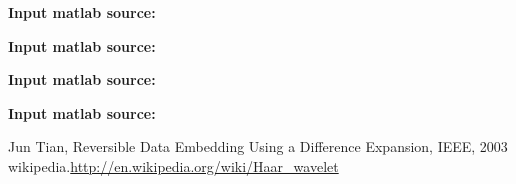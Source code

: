 \documentclass[a4paper,12pt]{article}%
\begin{document}
\textbf{\textcolor[rgb]{0.98,0.00,0.00}{Input matlab source:}}


\textbf{\textcolor[rgb]{0.98,0.00,0.00}{Input matlab source:}}


\textbf{\textcolor[rgb]{0.98,0.00,0.00}{Input matlab source:}}


\textbf{\textcolor[rgb]{0.98,0.00,0.00}{Input matlab source:}}


\begin{thebibliography}{99}
 Jun Tian, Reversible Data Embedding Using a Difference Expansion, IEEE, 2003
 wikipedia.\url{http://en.wikipedia.org/wiki/Haar_wavelet}
\end{thebibliography}
\end{document}
